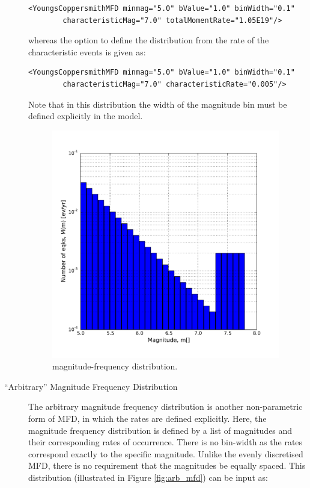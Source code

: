 \begin{description}
\begin{Verbatim}[frame=single, commandchars=\\\{\}, fontsize=\footnotesize]
    <YoungsCoppersmithMFD minmag="5.0" bValue="1.0" binWidth="0.1"
        characteristicMag="7.0" totalMomentRate="1.05E19"/>
\end{Verbatim}

\noindent whereas the option to define the distribution from the rate of the characteristic events is given as:

\begin{Verbatim}[frame=single, commandchars=\\\{\}, fontsize=\footnotesize]
    <YoungsCoppersmithMFD minmag="5.0" bValue="1.0" binWidth="0.1"
        characteristicMag="7.0" characteristicRate="0.005"/>
\end{Verbatim}

Note that in this distribution the width of the magnitude bin must be defined explicitly in the model.

\begin{figure}[!ht]
\centering
\includegraphics[width=10cm]{figures/hazard/yc_mfd_char_rate.pdf}
\caption{\cite{youngs1985} magnitude-frequency distribution.}
\label{fig:yc_gr_mfd}
\end{figure}

\item[``Arbitrary'' Magnitude Frequency Distribution]
The arbitrary magnitude frequency distribution is another non-parametric form of MFD, in which the rates are defined explicitly. Here, the magnitude frequency distribution is defined by a list of magnitudes and their corresponding rates of occurrence. There is no bin-width as the rates correspond exactly to the specific magnitude. Unlike the evenly discretised MFD, there is no requirement that the magnitudes be equally spaced. This distribution (illustrated in Figure \ref{fig:arb_mfd}) can be input as:


\end{description}
